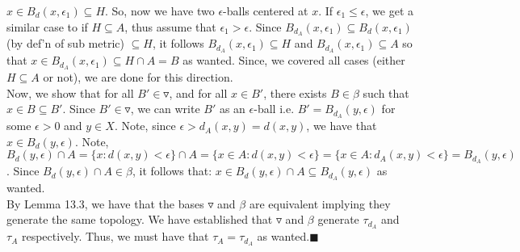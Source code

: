 \documentclass{article}
\begin{document}
    $x\in B_d(x,\epsilon_1)\subseteq H$. So, now we have two $\epsilon$-balls centered at $x$. If $\epsilon_1 \leq \epsilon$, we get a similar case to if $H\subseteq A$,
    thus assume that $\epsilon_1 > \epsilon$. Since $B_{d_A}(x,\epsilon_1)\subseteq B_d(x,\epsilon_1)$ (by def'n of sub metric) $\subseteq H$, 
    it follows $B_{d_A}(x,\epsilon_1)\subseteq H$ and $B_{d_A}(x,\epsilon_1)\subseteq A$ so that $x\in B_{d_A}(x,\epsilon_1)
    \subseteq H \cap A = B$ as wanted. Since, we covered all cases (either $H\subseteq A$ or not), we are done for this direction.\\
    Now, we show that for all $B'\in\triangledown$, and for all $x\in B'$, there exists $B\in\beta$ such that $x\in B\subseteq B'$. Since $B'\in\triangledown$,
    we can write $B'$ as an $\epsilon$-ball i.e. $B' = B_{d_A}(y,\epsilon)$ for some $\epsilon>0$ and $y\in X$. Note, since $\epsilon > d_A(x,y) = d(x,y)$, we have
    that $x\in B_d(y,\epsilon)$. Note, $B_d(y,\epsilon) \cap A = \{x: d(x,y) < \epsilon\} \cap A = 
    \{ x\in A: d(x,y) < \epsilon\} = \{ x\in A: d_A(x,y) < \epsilon\} = B_{d_A}(y,\epsilon)$. Since $B_d(y,\epsilon)\cap A\in\beta$, it follows that:
    $x\in B_d(y,\epsilon) \cap A \subseteq B_{d_A}(y,\epsilon)$ as wanted.\\
    By Lemma 13.3, we have that the bases $\triangledown$ and $\beta$ are equivalent implying they generate the same topology. We have established that
    $\triangledown$ and $\beta$ generate $\tau_{d_A}$ and $\tau_A$ respectively. Thus, we must have that $\tau_A = \tau_{d_A}$ as wanted.\hfill$\blacksquare$\\
\end{document}
